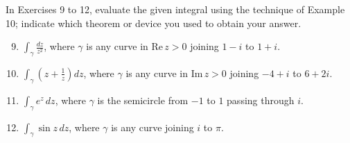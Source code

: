 \documentclass[12pt]{article}
\theoremstyle{definition} %
\theoremstyle{plain} %
\begin{document}
In Exercises 9 to 12, evaluate the given integral using the technique of Example 10; indicate which theorem or device you used to obtain your answer.
\begin{enumerate}
    \setcounter{enumi}{8}
    \item $\int_\gamma \frac{dz}{z^2}$, where $\gamma$ is any curve in $\text{Re}\, z > 0$ joining $1 - i$ to $1 + i$.
    \item $\int_\gamma \left( z + \frac{1}{z} \right) dz$, where $\gamma$ is any curve in $\text{Im}\, z > 0$ joining $-4 + i$ to $6 + 2i$.
    \item $\int_\gamma e^z \, dz$, where $\gamma$ is the semicircle from $-1$ to $1$ passing through $i$.
    \item $\int_\gamma \sin z \, dz$, where $\gamma$ is any curve joining $i$ to $\pi$.
\end{enumerate}
\noindent
\end{document}
